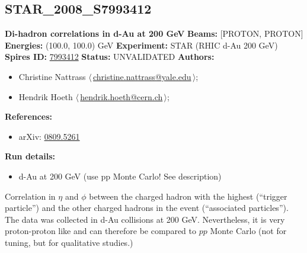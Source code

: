 \subsection[STAR\_2008\_S7993412]{STAR\_2008\_S7993412\,\cite{Nattrass:2008tw}}
\textbf{Di-hadron correlations in d-Au at 200 GeV}\newline
\textbf{Beams:} [PROTON, PROTON] \newline
\textbf{Energies:} (100.0, 100.0) GeV \newline
\textbf{Experiment:} STAR (RHIC d-Au 200 GeV) \newline
\textbf{Spires ID:} \href{http://www.slac.stanford.edu/spires/find/hep/www?rawcmd=key+7993412}{7993412}\newline
\textbf{Status:} UNVALIDATED\newline
\textbf{Authors:}
\begin{itemize}
  \item Christine Nattrass $\langle\,$\href{mailto:christine.nattrass@yale.edu}{christine.nattrass@yale.edu}$\,\rangle$;
  \item Hendrik Hoeth $\langle\,$\href{mailto:hendrik.hoeth@cern.ch}{hendrik.hoeth@cern.ch}$\,\rangle$;
\end{itemize}
\textbf{References:}
\begin{itemize}
  \item arXiv: \href{http://arxiv.org/abs/0809.5261}{0809.5261}
\end{itemize}
\textbf{Run details:}
\begin{itemize}

  \item d-Au at 200 GeV (use pp Monte Carlo! See description)\end{itemize}

\noindent Correlation in $\eta$ and $\phi$ between the charged hadron with the highest \pT (``trigger particle'') and the other charged hadrons in the event (``associated particles''). The data was collected in d-Au collisions at 200 GeV. Nevertheless, it is very proton-proton like and can therefore be compared to $pp$ Monte Carlo (not for tuning, but for qualitative studies.)

\clearpage


\clearpage

